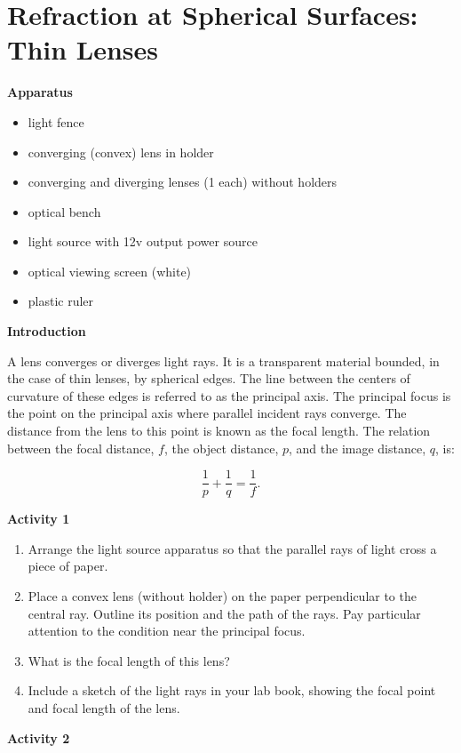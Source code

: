 \section{Refraction at Spherical Surfaces: Thin Lenses}

\makelabheader %

\medskip

\textbf{Apparatus}
\begin{itemize}[nosep]
\item light fence
\item converging (convex) lens in holder
\item converging and diverging lenses (1 each) without holders
\item optical bench 
\item light source with 12v output power source
\item optical viewing screen (white)
\item plastic ruler
\end{itemize}
\medskip


\textbf{Introduction} 

A lens converges or diverges light rays. It is a transparent material
bounded, in the case of thin lenses, by spherical edges. The line
between the centers of curvature of these edges is referred to as
the principal axis. The principal focus is the point on the principal
axis where parallel incident rays converge. The distance from the
lens to this point is known as the focal length. The relation between
the focal distance, $f$, the object distance, $p$, and the image distance,
$q$, is:

\begin{displaymath} \frac{1}{p} + \frac{1}{q} = \frac{1}{f}. \end{displaymath}


\textbf{Activity 1}

\begin{enumerate}[labparts]
\item Arrange the light source apparatus so that the parallel rays of light
cross a piece of paper. 
\item Place a convex lens (without holder) on the paper perpendicular to the central ray.
Outline its position and the path of the rays. Pay particular attention
to the condition near the principal focus.
\item What is the focal length of this lens?\vspace{15mm}
\item Include a sketch of the light rays in your lab book, showing the focal point and focal length of the lens.
\end{enumerate}
\textbf{Activity 2 }

